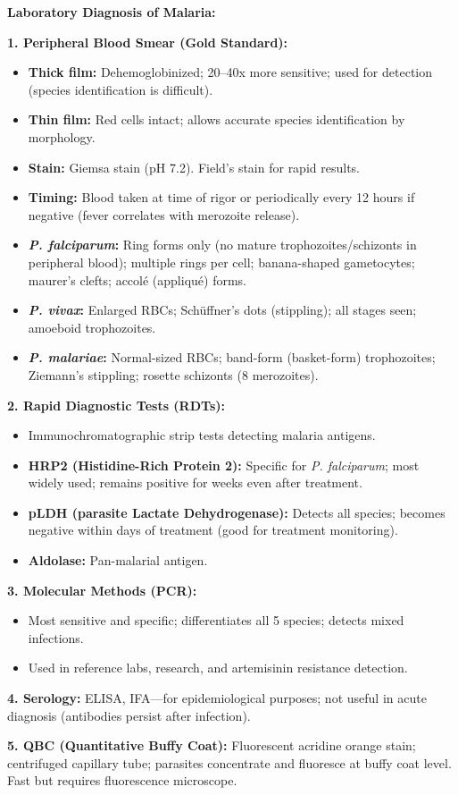 \documentclass[11pt,a4paper]{article}
\begin{document}
\begin{ansbox}
\textbf{Laboratory Diagnosis of Malaria:}

\textbf{1. Peripheral Blood Smear (Gold Standard):}
\begin{itemize}[leftmargin=*]
    \item \textbf{Thick film:} Dehemoglobinized; 20--40x more sensitive; used for detection (species identification is difficult).
    \item \textbf{Thin film:} Red cells intact; allows accurate species identification by morphology.
    \item \textbf{Stain:} Giemsa stain (pH 7.2). Field's stain for rapid results.
    \item \textbf{Timing:} Blood taken at time of rigor or periodically every 12 hours if negative (fever correlates with merozoite release).
    \item \textbf{\textit{P. falciparum}:} Ring forms only (no mature trophozoites/schizonts in peripheral blood); multiple rings per cell; banana-shaped gametocytes; maurer's clefts; accolé (appliqué) forms.
    \item \textbf{\textit{P. vivax}:} Enlarged RBCs; Schüffner's dots (stippling); all stages seen; amoeboid trophozoites.
    \item \textbf{\textit{P. malariae}:} Normal-sized RBCs; band-form (basket-form) trophozoites; Ziemann's stippling; rosette schizonts (8 merozoites).
\end{itemize}

\textbf{2. Rapid Diagnostic Tests (RDTs):}
\begin{itemize}[leftmargin=*]
    \item Immunochromatographic strip tests detecting malaria antigens.
    \item \textbf{HRP2 (Histidine-Rich Protein 2):} Specific for \textit{P. falciparum}; most widely used; remains positive for weeks even after treatment.
    \item \textbf{pLDH (parasite Lactate Dehydrogenase):} Detects all species; becomes negative within days of treatment (good for treatment monitoring).
    \item \textbf{Aldolase:} Pan-malarial antigen.
\end{itemize}

\textbf{3. Molecular Methods (PCR):}
\begin{itemize}[leftmargin=*]
    \item Most sensitive and specific; differentiates all 5 species; detects mixed infections.
    \item Used in reference labs, research, and artemisinin resistance detection.
\end{itemize}

\textbf{4. Serology:} ELISA, IFA---for epidemiological purposes; not useful in acute diagnosis (antibodies persist after infection).

\textbf{5. QBC (Quantitative Buffy Coat):} Fluorescent acridine orange stain; centrifuged capillary tube; parasites concentrate and fluoresce at buffy coat level. Fast but requires fluorescence microscope.
\end{ansbox}
\end{document}
